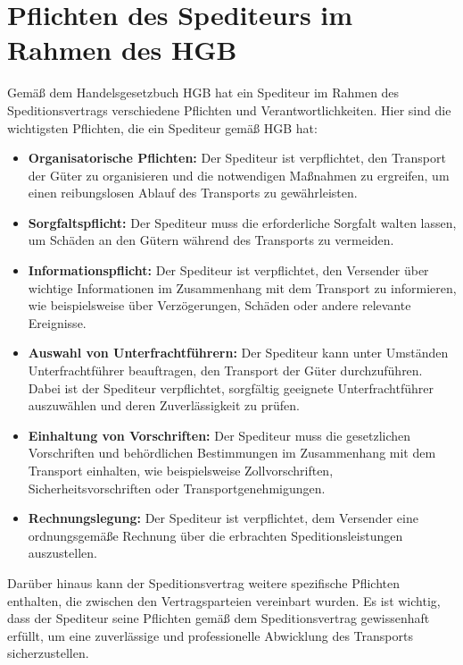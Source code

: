 \section{Pflichten des Spediteurs im Rahmen des \ac{HGB}}

Gemäß dem Handelsgesetzbuch \ac{HGB} hat ein Spediteur im Rahmen des Speditionsvertrags verschiedene Pflichten und Verantwortlichkeiten. Hier sind die wichtigsten Pflichten, die ein Spediteur gemäß \ac{HGB} hat:

\begin{itemize}
    \item \textbf{Organisatorische Pflichten:} Der Spediteur ist verpflichtet, den Transport der Güter zu organisieren und die notwendigen Maßnahmen zu ergreifen, um einen reibungslosen Ablauf des Transports zu gewährleisten.
    \item \textbf{Sorgfaltspflicht:} Der Spediteur muss die erforderliche Sorgfalt walten lassen, um Schäden an den Gütern während des Transports zu vermeiden.
    \item \textbf{Informationspflicht:} Der Spediteur ist verpflichtet, den Versender über wichtige Informationen im Zusammenhang mit dem Transport zu informieren, wie beispielsweise über Verzögerungen, Schäden oder andere relevante Ereignisse.
    \item \textbf{Auswahl von Unterfrachtführern:} Der Spediteur kann unter Umständen Unterfrachtführer beauftragen, den Transport der Güter durchzuführen. Dabei ist der Spediteur verpflichtet, sorgfältig geeignete Unterfrachtführer auszuwählen und deren Zuverlässigkeit zu prüfen.
    \item \textbf{Einhaltung von Vorschriften:} Der Spediteur muss die gesetzlichen Vorschriften und behördlichen Bestimmungen im Zusammenhang mit dem Transport einhalten, wie beispielsweise Zollvorschriften, Sicherheitsvorschriften oder Transportgenehmigungen.
    \item \textbf{Rechnungslegung:} Der Spediteur ist verpflichtet, dem Versender eine ordnungsgemäße Rechnung über die erbrachten Speditionsleistungen auszustellen.
    \end{itemize}

Darüber hinaus kann der Speditionsvertrag weitere spezifische Pflichten enthalten, die zwischen den Vertragsparteien vereinbart wurden. Es ist wichtig, dass der Spediteur seine Pflichten gemäß dem Speditionsvertrag gewissenhaft erfüllt, um eine zuverlässige und professionelle Abwicklung des Transports sicherzustellen.

